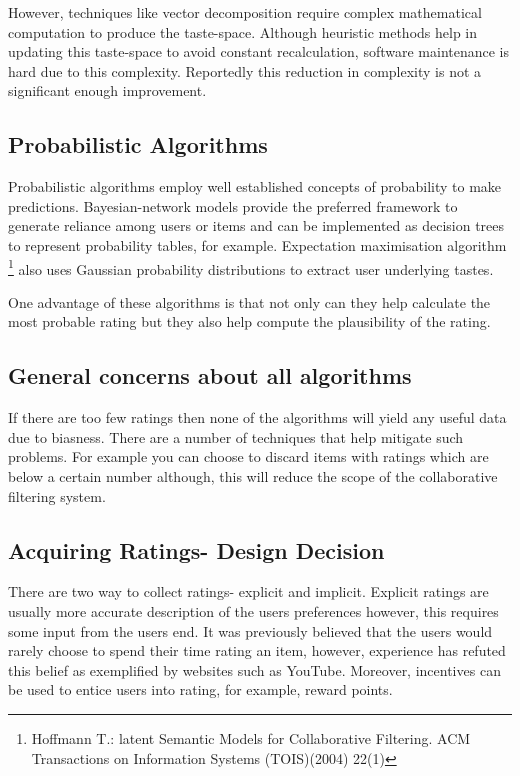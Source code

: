 However, techniques like vector decomposition require complex mathematical computation to produce the taste-space. Although heuristic methods help in updating this taste-space to avoid constant recalculation, software maintenance is hard due to this complexity. Reportedly this reduction in complexity is not a significant enough improvement.

\subsection{Probabilistic Algorithms}

Probabilistic algorithms employ well established concepts of probability to make predictions. Bayesian-network models provide the preferred framework to generate reliance among users or items and can be implemented as decision trees to represent probability tables, for example. 
Expectation maximisation algorithm \footnote{Hoffmann T.: latent Semantic Models for Collaborative Filtering. ACM Transactions on Information Systems (TOIS)(2004) 22(1)} also uses Gaussian probability distributions to extract user underlying tastes.

One advantage of these algorithms is that not only can they help calculate the most probable rating but they also help compute the plausibility of the rating.

\subsection{General concerns about all algorithms}

If there are too few ratings then none of the algorithms will yield any useful data due to biasness. There are a number of techniques that help mitigate such problems. For example you can choose to discard items with ratings which are below a certain number although, this will reduce the scope of the collaborative filtering system.

\subsection{Acquiring Ratings- Design Decision}

There are two way to collect ratings- explicit and implicit. Explicit ratings are usually more accurate description of the users preferences however, this requires some input from the users end. It was previously believed that the users would rarely choose to spend their time rating an item, however, experience has refuted this belief as exemplified by websites such as YouTube. Moreover, incentives can be used to entice users into rating, for example, reward points.

